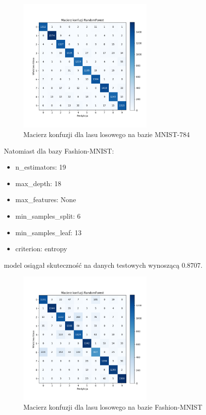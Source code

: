 \documentclass{article}
\begin{document}
\begin{figure}[H]
    \centering
    \includegraphics[width=0.6\textwidth]{../Saves/Trees/mnist-784/RandomForest_mnist_784_conf_mat.png}
    \caption{Macierz konfuzji dla lasu losowego na bazie MNIST-784}
\end{figure}

Natomiast dla bazy Fashion-MNIST:

\begin{itemize}
    \item n\_estimators: 19
    \item max\_depth: 18
    \item max\_features: None
    \item min\_samples\_split: 6
    \item min\_samples\_leaf: 13
    \item criterion: entropy
\end{itemize}

model osiągał skuteczność na danych testowych wynoszącą $0.8707$.

\begin{figure}[H]
    \centering
    \includegraphics[width=0.6\textwidth]{../Saves/Trees/fashion-mnist/RandomForest_fashion-mnist_conf_mat.png}
    \caption{Macierz konfuzji dla lasu losowego na bazie Fashion-MNIST}
\end{figure}
\end{document}
